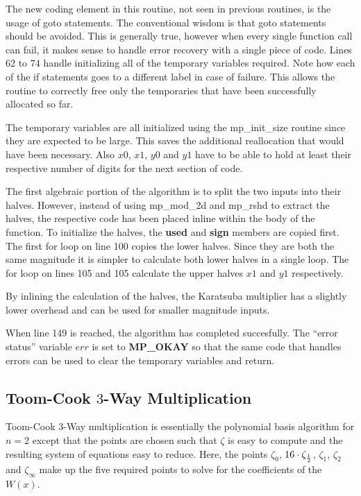 \documentclass[b5paper]{book}
\begin{document}
The new coding element in this routine, not  seen in previous routines, is the usage of goto statements.  The conventional
wisdom is that goto statements should be avoided.  This is generally true, however when every single function call can fail, it makes sense
to handle error recovery with a single piece of code.  Lines 62 to 74 handle initializing all of the temporary variables 
required.  Note how each of the if statements goes to a different label in case of failure.  This allows the routine to correctly free only
the temporaries that have been successfully allocated so far.

The temporary variables are all initialized using the mp\_init\_size routine since they are expected to be large.  This saves the 
additional reallocation that would have been necessary.  Also $x0$, $x1$, $y0$ and $y1$ have to be able to hold at least their respective
number of digits for the next section of code.

The first algebraic portion of the algorithm is to split the two inputs into their halves.  However, instead of using mp\_mod\_2d and mp\_rshd
to extract the halves, the respective code has been placed inline within the body of the function.  To initialize the halves, the \textbf{used} and 
\textbf{sign} members are copied first.  The first for loop on line 100 copies the lower halves.  Since they are both the same magnitude it 
is simpler to calculate both lower halves in a single loop.  The for loop on lines 105 and 105 calculate the upper halves $x1$ and 
$y1$ respectively.

By inlining the calculation of the halves, the Karatsuba multiplier has a slightly lower overhead and can be used for smaller magnitude inputs.

When line 149 is reached, the algorithm has completed succesfully.  The ``error status'' variable $err$ is set to \textbf{MP\_OKAY} so that
the same code that handles errors can be used to clear the temporary variables and return.  

\subsection{Toom-Cook $3$-Way Multiplication}
Toom-Cook $3$-Way \cite{TOOM} multiplication is essentially the polynomial basis algorithm for $n = 2$ except that the points  are 
chosen such that $\zeta$ is easy to compute and the resulting system of equations easy to reduce.  Here, the points $\zeta_{0}$, 
$16 \cdot \zeta_{1 \over 2}$, $\zeta_1$, $\zeta_2$ and $\zeta_{\infty}$ make up the five required points to solve for the coefficients 
of the $W(x)$.
\end{document}
